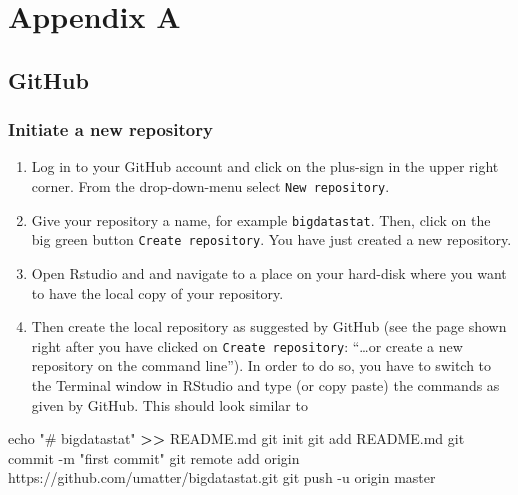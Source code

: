 \documentclass[
  12pt,
]{style/krantz}
\newenvironment{Shaded}{\begin{snugshade}}{\end{snugshade}}
\newcommand{\AttributeTok}[1]{\textcolor[rgb]{0.77,0.63,0.00}{#1}}
\newcommand{\BuiltInTok}[1]{#1}
\newcommand{\FunctionTok}[1]{\textcolor[rgb]{0.00,0.00,0.00}{#1}}
\newcommand{\NormalTok}[1]{#1}
\newcommand{\OperatorTok}[1]{\textcolor[rgb]{0.81,0.36,0.00}{\textbf{#1}}}
\newcommand{\StringTok}[1]{\textcolor[rgb]{0.31,0.60,0.02}{#1}}
\providecommand{\tightlist}{%
  \setlength{\itemsep}{0pt}\setlength{\parskip}{0pt}}
\begin{document}
\backmatter

\hypertarget{appendix-appendix}{%
\appendix {}}


\hypertarget{appendix-a}{%
\chapter{Appendix A}\label{appendix-a}}

\hypertarget{github}{%
\section{GitHub}\label{github}}

\hypertarget{initiate-a-new-repository}{%
\subsection{Initiate a new repository}\label{initiate-a-new-repository}}

\begin{enumerate}
\def\labelenumi{\arabic{enumi}.}
\tightlist
\item
  Log in to your GitHub account and click on the plus-sign in the upper right corner. From the drop-down-menu select \texttt{New\ repository}.
\item
  Give your repository a name, for example \texttt{bigdatastat}. Then, click on the big green button \texttt{Create\ repository}. You have just created a new repository.
\item
  Open Rstudio and and navigate to a place on your hard-disk where you want to have the local copy of your repository.
\item
  Then create the local repository as suggested by GitHub (see the page shown right after you have clicked on \texttt{Create\ repository}: ``\ldots or create a new repository on the command line''). In order to do so, you have to switch to the Terminal window in RStudio and type (or copy paste) the commands as given by GitHub. This should look similar to
\end{enumerate}

\begin{Shaded}
\begin{Highlighting}[]
\BuiltInTok{echo} \StringTok{"\# bigdatastat"} \OperatorTok{\textgreater{}\textgreater{}}\NormalTok{ README.md}
\FunctionTok{git}\NormalTok{ init}
\FunctionTok{git}\NormalTok{ add README.md}
\FunctionTok{git}\NormalTok{ commit }\AttributeTok{{-}m} \StringTok{"first commit"}
\FunctionTok{git}\NormalTok{ remote add origin https://github.com/umatter/bigdatastat.git}
\FunctionTok{git}\NormalTok{ push }\AttributeTok{{-}u}\NormalTok{ origin master}
\end{Highlighting}
\end{Shaded}
\end{document}
